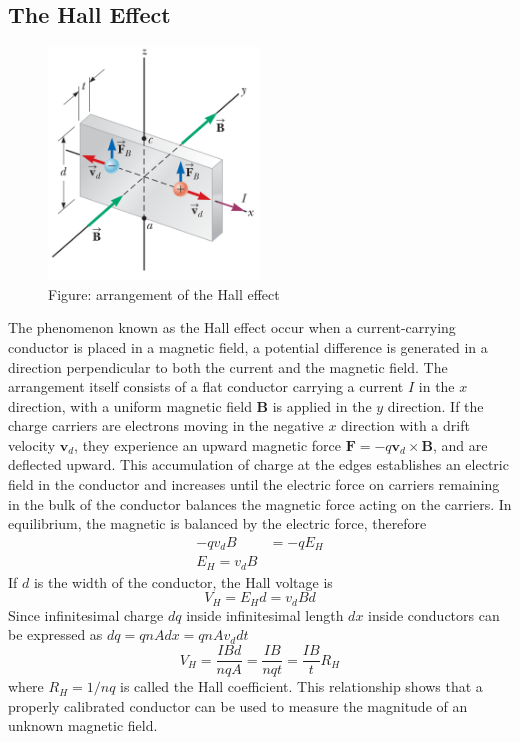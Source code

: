 \documentclass[../../../main.tex]{subfiles}
\begin{document}
\subsection*{The Hall Effect} 
\begin{figure}[t]
    \centering
    \includegraphics[width=0.5\textwidth]{../Rss/Electromagnetism/Magnetostatics/HallEffect}
    \caption*{Figure: arrangement of the Hall effect}
\end{figure}
The phenomenon known as the Hall effect occur when a current-carrying conductor is placed in a magnetic field, a potential difference is generated in a direction perpendicular to both the current and the magnetic field. The arrangement itself consists of a flat conductor carrying a current $I$ in the $x$ direction, with a uniform magnetic field \textbf{B} is applied in the $y$ direction. If the charge carriers are electrons moving in the negative $x$ direction with a drift velocity $\mathbf{v}_d$, they experience an upward magnetic force $\mathbf{F}=-q\mathbf{v}_d\times\mathbf{B}$, and are deflected upward. This accumulation of charge at the edges establishes an electric field in the conductor and increases until the electric force on carriers remaining in the bulk of the conductor balances the magnetic force acting on the carriers. In equilibrium, the magnetic is balanced by the electric force, therefore
\begin{align*}
    -qv_dB&=-qE_H\\
    E_H=v_dB
\end{align*}
If $d$ is the width of the conductor, the Hall voltage is
\begin{equation*}
    V_H=E_Hd=v_dBd
\end{equation*}
Since infinitesimal charge $dq$ inside infinitesimal length $dx$ inside conductors can be expressed as $dq=qnAdx=qnAv_ddt$
\begin{equation*}
    V_H=\frac{IBd}{nqA}=\frac{IB}{nqt}=\frac{IB}{t}R_H
\end{equation*}
where $R_H=1/nq$ is called the Hall coefficient. This relationship shows that a properly calibrated conductor can be used to measure the magnitude of an unknown magnetic field. 
\end{document}
